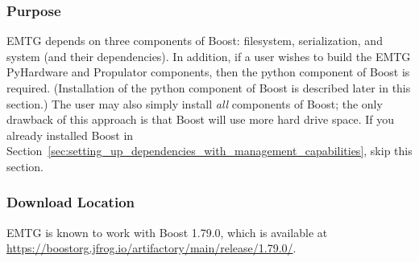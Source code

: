 
\subsubsection{Purpose}

\ac{EMTG} depends on three components of Boost: filesystem, serialization, and system (and their dependencies). In addition, if a user wishes to build the \ac{EMTG} PyHardware and Propulator components, then the python component of Boost is required. (Installation of the python component of Boost is described later in this section.) The user may also simply install \emph{all} components of Boost; the only drawback of this approach is that Boost will use more hard drive space. If you already installed Boost in Section~\ref{sec:setting_up_dependencies_with_management_capabilities}, skip this section. 

\subsubsection{Download Location}

\ac{EMTG} is known to work with Boost 1.79.0, which is available at \url{https://boostorg.jfrog.io/artifactory/main/release/1.79.0/}.

